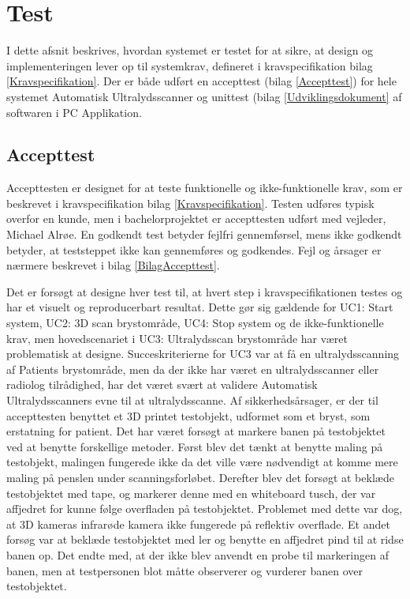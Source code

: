\chapter{Test}\label{Test}
I dette afsnit beskrives, hvordan systemet er testet for at sikre, at design og implementeringen lever op til systemkrav, defineret i kravspecifikation bilag \ref{Kravspecifikation}. Der er både udført en accepttest (bilag \ref{Accepttest})  for hele systemet Automatisk Ultralydsscanner og unittest (bilag \ref{Udviklingsdokument} af softwaren i PC Applikation. 

\section{Accepttest}

Accepttesten er designet for at teste funktionelle og ikke-funktionelle krav, som er beskrevet i kravspecifikation bilag \ref{Kravspecifikation}. Testen udføres typisk overfor en kunde, men i bachelorprojektet er accepttesten udført med vejleder, Michael Alrøe. En godkendt test betyder fejlfri gennemførsel, mens ikke godkendt betyder, at teststeppet ikke kan gennemføres og godkendes. Fejl og årsager er nærmere beskrevet i bilag \ref{BilagAccepttest}.  

Det er forsøgt at designe hver test til, at hvert step i kravspecifikationen testes og har et visuelt og reproducerbart resultat. Dette gør sig gældende for UC1: Start system, UC2: 3D scan brystområde, UC4: Stop system og de ikke-funktionelle krav, men hovedscenariet i UC3: Ultralydsscan brystområde har været problematisk at designe. Succeskriterierne for UC3 var at få en ultralydsscanning af Patients brystområde, men da der ikke har været en ultralydsscanner eller radiolog tilrådighed, har det været svært at validere Automatisk Ultralydsscanners evne til at ultralydsscanne. Af sikkerhedsårsager, er der til accepttesten benyttet et 3D printet testobjekt, udformet som et bryst, som erstatning for patient. Det har været forsøgt at markere banen på testobjektet ved at benytte forskellige metoder. Først blev det tænkt at benytte maling på testobjekt, malingen fungerede ikke da det ville være nødvendigt at komme mere maling på penslen under scanningsforløbet. Derefter blev det forsøgt at beklæde testobjektet med tape, og markerer denne med en whiteboard tusch, der var affjedret for kunne følge overfladen på testobjektet. Problemet med dette var dog, at 3D kameras infrarøde kamera ikke fungerede på reflektiv overflade. Et andet forsøg var at beklæde testobjektet med ler og benytte en affjedret pind til at ridse banen op. Det endte med, at der ikke blev anvendt en probe til markeringen af banen, men at testpersonen blot måtte observerer og vurderer banen over testobjektet. 
\newpage
